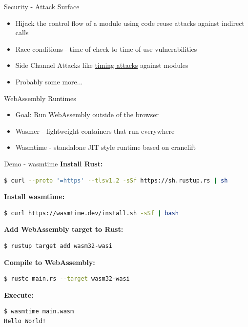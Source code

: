 \documentclass{beamer}
\begin{document}
\begin{frame}{Security - Attack Surface}
    \begin{itemize}
        \item Hijack the control flow of a module using code reuse attacks against indirect calls
        \item Race conditions - time of check to time of use vulnerabilities
        \item Side Channel Attacks like \href{https://github.com/tc39/ecmascript_sharedmem/blob/master/issues/TimingAttack.md}{timing attacks} against modules
        \item Probably some more...
    \end{itemize}
\end{frame}

\begin{frame}{WebAssembly Runtimes}
    \begin{itemize}
        \item Goal: Run WebAssembly outside of the browser
        \item Wasmer - lightweight containers that run everywhere
        \item Wasmtime - standalone JIT style runtime based on cranelift
    \end{itemize}
\end{frame}

\begin{frame}[fragile]{Demo - wasmtime}
    \textbf{Install Rust:}
    \begin{lstlisting}[language=bash,basicstyle=\scriptsize]
$ curl --proto '=https' --tlsv1.2 -sSf https://sh.rustup.rs | sh
    \end{lstlisting}

    \textbf{Install wasmtime:}
    \begin{lstlisting}[language=bash,basicstyle=\scriptsize]
$ curl https://wasmtime.dev/install.sh -sSf | bash
    \end{lstlisting}

    \textbf{Add WebAssembly target to Rust:}
    \begin{lstlisting}[language=bash,basicstyle=\scriptsize]
$ rustup target add wasm32-wasi
    \end{lstlisting}

    \textbf{Compile to WebAssembly:}
    \begin{lstlisting}[language=bash,basicstyle=\scriptsize]
$ rustc main.rs --target wasm32-wasi
    \end{lstlisting}

    \textbf{Execute:}
    \begin{lstlisting}[language=bash,basicstyle=\scriptsize]
$ wasmtime main.wasm
Hello World!
    \end{lstlisting}
\end{frame}


\end{document}
